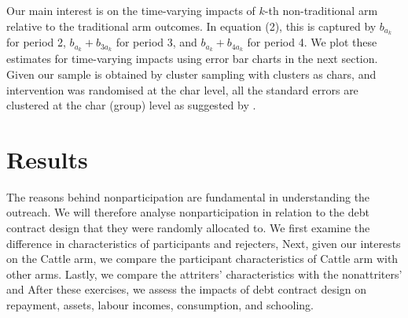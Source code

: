 	Our main interest is on the time-varying impacts of $k$-th non-traditional arm relative to the traditional arm outcomes. In equation (2), this is captured by $b_{a_{k}}$ for period 2, $b_{a_{k}} + b_{3a_{k}}$ for period 3, and $b_{a_{k}} + b_{4a_{k}}$ for period 4. We plot these estimates for time-varying impacts using error bar charts in the next section. Given our sample is obtained by cluster sampling with clusters as chars, and intervention was randomised at the char level, all the standard errors are clustered at the char (group) level as suggested by \citet{AbadieAtheyImbensWooldridge2022}.%


\section{Results}
\label{SecResults}








	The reasons behind nonparticipation are fundamental in understanding the outreach. We will therefore analyse nonparticipation in relation to the debt contract design that they were randomly allocated to. We first examine the difference in characteristics of participants and rejecters,  Next, given our interests on the \textsf{Cattle} arm, we compare the participant characteristics of \textsf{Cattle} arm with other arms.  Lastly, we compare the attriters' characteristics with the nonattriters' and  After these exercises, we assess the impacts of debt contract design on repayment, assets, labour incomes, consumption, and schooling. 


